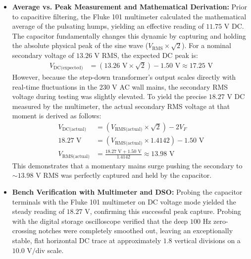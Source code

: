 \documentclass[journal,12pt,onecolumn]{IEEEtran}
\begin{document}
\begin{itemize}
    \item \textbf{Average vs. Peak Measurement and Mathematical Derivation:} Prior to capacitive filtering, the Fluke 101 multimeter calculated the mathematical average of the pulsating humps, yielding an effective reading of $11.75\text{ V}$ DC. The capacitor fundamentally changes this dynamic by capturing and holding the absolute physical peak of the sine wave ($V_{\text{RMS}} \times \sqrt{2}$). For a nominal secondary voltage of $13.26\text{ V}$ RMS, the expected DC peak is:
    \begin{align}
        V_{\text{DC(expected)}} &= (13.26\text{ V} \times \sqrt{2}) - 1.50\text{ V} \approx 17.25\text{ V}
    \end{align}
    However, because the step-down transformer's output scales directly with real-time fluctuations in the $230\text{ V}$ AC wall mains, the secondary RMS voltage during testing was slightly elevated. To yield the precise $18.27\text{ V}$ DC measured by the multimeter, the actual secondary RMS voltage at that moment is derived as follows:
    \begin{align}
        V_{\text{DC(actual)}} &= (V_{\text{RMS(actual)}} \times \sqrt{2}) - 2V_F \nonumber \\
        18.27\text{ V} &= (V_{\text{RMS(actual)}} \times 1.4142) - 1.50\text{ V} \nonumber \\
        V_{\text{RMS(actual)}} &= \frac{18.27\text{ V} + 1.50\text{ V}}{1.4142} \approx 13.98\text{ V}
    \end{align}
    This demonstrates that a momentary mains surge pushing the secondary to $\sim 13.98\text{ V}$ RMS was perfectly captured and held by the capacitor.

    \item \textbf{Bench Verification with Multimeter and DSO:} Probing the capacitor terminals with the Fluke 101 multimeter on DC voltage mode yielded the steady reading of $18.27\text{ V}$, confirming this successful peak capture. Probing with the digital storage oscilloscope verified that the deep $100\text{ Hz}$ zero-crossing notches were completely smoothed out, leaving an exceptionally stable, flat horizontal DC trace at approximately $1.8$ vertical divisions on a $10.0\text{ V/div}$ scale.


\end{itemize}
\end{document}
